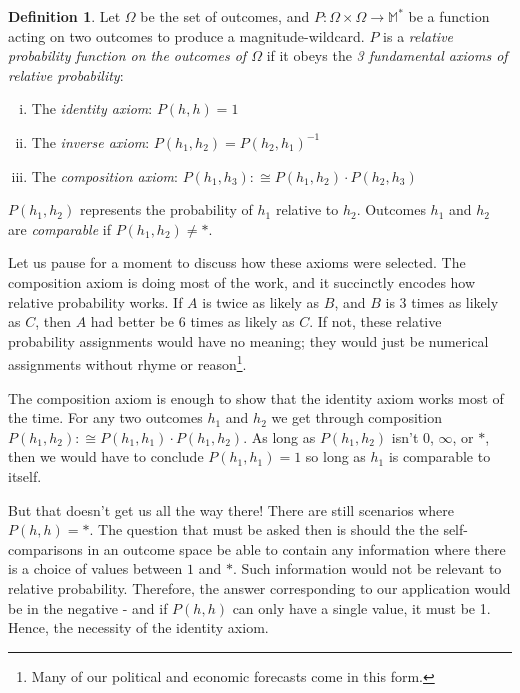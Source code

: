 \documentclass[twoside]{article}
\theoremstyle{plain}%
\theoremstyle{definition}
\newtheorem{definition}{Definition}[section]
\theoremstyle{remark}
\begin{document}
\begin{definition}
\label{def:fundamental_laws}
Let \(\Omega\) be the set of outcomes, and \(P: \Omega \times \Omega \rightarrow \mathbb{M}^*\) be a function acting on two outcomes to produce a magnitude-wildcard. \(P\) is a \textit{relative probability function on the outcomes of \(\Omega\)} if it obeys the \textit{3 fundamental axioms of relative probability}:

\begin{enumerate}[(i)]
\item The \textit{identity axiom}: \(P(h, h) = 1\)
\item The \textit{inverse axiom}: \(P(h_1, h_2) = P(h_2, h_1)^{-1}\)
\item The \textit{composition axiom}: \(P(h_1, h_3) :\cong P(h_1, h_2) \cdot P(h_2, h_3)\)
\end{enumerate}

\end{definition}

\(P(h_1, h_2)\) represents the probability of \(h_1\) relative to \(h_2\). Outcomes \(h_1\) and \(h_2\) are \textit{comparable} if \(P(h_1, h_2) \neq \ast\).

Let us pause for a moment to discuss how these axioms were selected. The composition axiom is doing most of the work, and it succinctly encodes how relative probability works. If \(A\) is twice as likely as \(B\), and \(B\) is 3 times as likely as \(C\), then \(A\) had better be 6 times as likely as \(C\). If not, these relative probability assignments would have no meaning; they would just be numerical assignments without rhyme or reason\footnote{Many of our political and economic forecasts come in this form.}.

The composition axiom is enough to show that the identity axiom works most of the time. For any two outcomes \(h_1\) and \(h_2\) we get through composition \(P(h_1, h_2) :\cong P(h_1, h_1) \cdot P(h_1, h_2)\). As long as \(P(h_1, h_2)\) isn't \(0\), \(\infty\), or \(\ast\), then we would have to conclude \(P(h_1, h_1) = 1\) so long as \(h_1\) is comparable to itself.

But that doesn't get us all the way there! There are still scenarios where \(P(h, h) = \ast\). The question that must be asked then is should the the self-comparisons in an outcome space be able to contain any information where there is a choice of values between \(1\) and \(\ast\). Such information would not be relevant to relative probability. Therefore, the answer corresponding to our application would be in the negative - and if \(P(h, h)\) can only have a single value, it must be 1. Hence, the necessity of the identity axiom.
\end{document}
